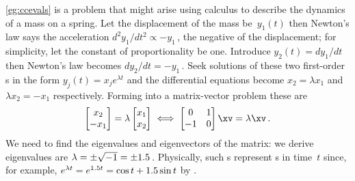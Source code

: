 \cref{eg:ccevals} is a problem that might arise using calculus to describe the dynamics of a mass on a spring.  
Let the displacement of the mass be~\(y_1(t)\) then Newton's law says the acceleration \(d^2y_1/dt^2\propto -y_1\)\,, the negative of the displacement; for simplicity, let the constant of proportionality be one.  
Introduce \(y_2(t)=dy_1/dt\) then Newton's law becomes \(dy_2/dt=-y_1\)\,.  
Seek solutions of these two first-order s in the form \(y_j(t)=x_je^{\lambda t}\) and the differential equations become \(x_2=\lambda x_1\) and \(\lambda x_2=-x_1\) respectively.  
Forming into a matrix-vector problem these are
\begin{equation*}
\begin{bmatrix} x_2\\-x_1 \end{bmatrix}
=\lambda\begin{bmatrix} x_1\\x_2 \end{bmatrix}
\iff
\begin{bmatrix} 0&1\\-1&0 \end{bmatrix}\xv=\lambda\xv\,.
\end{equation*}
We need to find the eigenvalues and eigenvectors of the matrix: we derive eigenvalues are \(\lambda=\pm \sqrt{-1}=\pm 1.5\)\,. 
Physically, such s represent s in time~\(t\) since, for example, \(e^{\lambda t}=e^{1.5 t}=\cos t+1.5\sin t\) by . 








\sectionExercises


